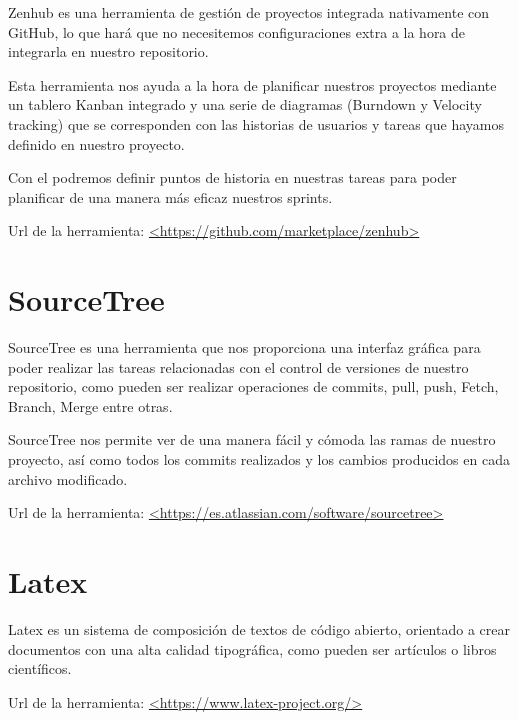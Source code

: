 Zenhub es una herramienta de gestión de proyectos integrada nativamente con GitHub, lo que hará que no necesitemos configuraciones extra a la hora de integrarla en nuestro repositorio. 

Esta herramienta nos ayuda a la hora de planificar nuestros proyectos mediante un tablero Kanban integrado y una serie de diagramas (Burndown y Velocity tracking) que se corresponden con las historias de usuarios y tareas que hayamos definido en nuestro proyecto.

Con el podremos definir puntos de historia en nuestras tareas para poder planificar de una manera más eficaz nuestros sprints.

Url de la herramienta: \url{<https://github.com/marketplace/zenhub>}

\section{SourceTree}

SourceTree es una herramienta que nos proporciona una interfaz gráfica para poder realizar las tareas relacionadas con el control de versiones de nuestro repositorio, como pueden ser realizar  operaciones de commits, pull, push, Fetch, Branch, Merge entre otras.

SourceTree nos permite ver de una manera fácil y cómoda las ramas de nuestro proyecto, así como todos los commits realizados y los cambios producidos en cada archivo modificado.

Url de la herramienta: \url{<https://es.atlassian.com/software/sourcetree>}

\section{Latex}

Latex es un sistema de composición de textos de código abierto, orientado a crear documentos con una alta calidad tipográfica, como pueden ser artículos o libros científicos.\cite{wiki:Latex}

Url de la herramienta: \url{<https://www.latex-project.org/>}



